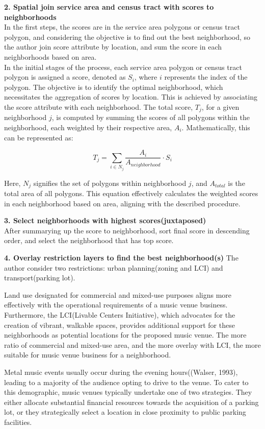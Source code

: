 \documentclass[11pt]{article}
\begin{document}
\textbf{2. Spatial join service area and census tract with scores to neighborhoods\\}
In the first steps, the scores are in the service area polygons or census tract polygon, and considering the objective is to find out the best neighborhood, so the author join score attribute by location, and sum the score in each neighborhoods based on area.\\
In the initial stages of the process, each service area polygon or census tract polygon is assigned a score, denoted as $S_i$, where $i$ represents the index of the polygon. The objective is to identify the optimal neighborhood, which necessitates the aggregation of scores by location. This is achieved by associating the score attribute with each neighborhood. The total score, $T_j$, for a given neighborhood $j$, is computed by summing the scores of all polygons within the neighborhood, each weighted by their respective area, $A_i$. Mathematically, this can be represented as:

\begin{equation}
T_j = \sum_{i \in N_j} \frac{A_i}{A_{neighborhood}} \cdot S_i
\end{equation}

Here, $N_j$ signifies the set of polygons within neighborhood $j$, and $A_{total}$ is the total area of all polygons. This equation effectively calculates the weighted scores in each neighborhood based on area, aligning with the described procedure.


\textbf{3. Select neighborhoods with highest scores(juxtaposed)\\}
After summarying up the score to neighborhood, sort final score in descending order, and select the neighborhood that has top score.


\textbf{4. Overlay restriction layers to find the best neighborhood(s)}
The author consider two restrictions: urban planning(zoning and LCI) and transport(parking lot).  

Land use designated for commercial and mixed-use purposes aligns more effectively with the operational requirements of a music venue business. Furthermore, the LCI(Livable Centers Initiative), which advocates for the creation of vibrant, walkable spaces, provides additional support for these neighborhoods as potential locations for the proposed music venue. The more ratio of commercial and mixed-use area, and the more overlay with LCI, the more suitable for music venue business for a neighborhood.

Metal music events usually occur during the evening hours((Walser, 1993), leading to a majority of the audience opting to drive to the venue. To cater to this demographic, music venues typically undertake one of two strategies. They either allocate substantial financial resources towards the acquisition of a parking lot, or they strategically select a location in close proximity to public parking facilities. 
\end{document}
